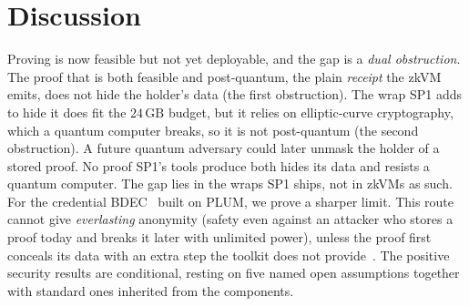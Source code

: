 \section{Discussion}
Proving is now feasible but not yet deployable, and the gap is a \emph{dual obstruction}. The proof that is both feasible and post-quantum, the plain \emph{receipt} the zkVM emits, does not hide the holder's data (the first obstruction). The wrap SP1 adds to hide it does fit the $24\,\mathrm{GB}$ budget, but it relies on elliptic-curve cryptography, which a quantum computer breaks, so it is not post-quantum (the second obstruction). A future quantum adversary could later unmask the holder of a stored proof. No proof SP1's tools produce both hides its data and resists a quantum computer. The gap lies in the wraps SP1 ships, not in zkVMs as such. For the credential BDEC~\cite{10.1007/978-981-96-0957-4_3} built on PLUM, we prove a sharper limit. This route cannot give \emph{everlasting} anonymity (safety even against an attacker who stores a proof today and breaks it later with unlimited power), unless the proof first conceals its data with an extra step the toolkit does not provide~\cite{cgh2004rom}. The positive security results are conditional, resting on five named open assumptions together with standard ones inherited from the components.
